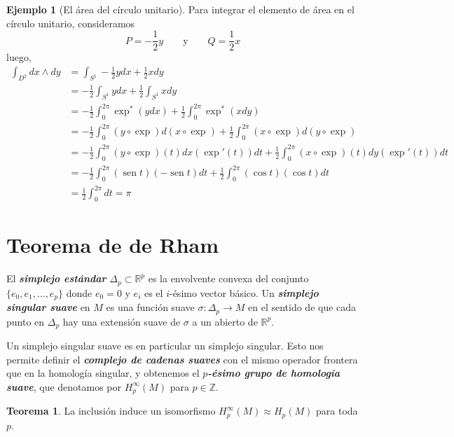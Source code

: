 \documentclass[spanish]{article}
\theoremstyle{definition}
\newtheorem*{teo}{Teorema}
\newtheorem*{ejem}{Ejemplo}
\newcommand{\R}{\mathbb{R}}
\newcommand{\Z}{\mathbb{Z}}
\DeclareMathOperator{\sen}{sen}
\begin{document}
	\begin{ejem}[El área del círculo unitario]
		Para integrar el elemento de área en el círculo unitario, consideramos
		\[P=-\frac{1}{2}y\qquad\text{y}\qquad Q=\frac{1}{2}x\]
		luego,
		\begin{align*}
			\int_{D^2}dx\wedge dy&=\int_{S^1}-\frac{1}{2}ydx+\frac{1}{2}xdy\\
			&=-\frac{1}{2}\int_{S^1}ydx+\frac{1}{2}\int_{S^1}xdy\\
			&=-\frac{1}{2}\int_0^{2\pi}\exp^*(ydx)+\frac{1}{2}\int_0^{2\pi}\exp^*(xdy)\\
			&=-\frac{1}{2}\int_0^{2\pi}(y\circ \exp)d(x\circ \exp)+\frac{1}{2}\int_0^{2\pi}(x\circ \exp)d(y\circ \exp)\\
			&=-\frac{1}{2}\int_0^{2\pi}(y\circ \exp)(t)dx(\exp'(t))dt+\frac{1}{2}\int_0^{2\pi}(x\circ \exp)(t)dy(\exp'(t))dt\\
			&=-\frac{1}{2}\int_0^{2\pi}(\sen t)(-\sen t) dt+\frac{1}{2}\int_0^{2\pi}(\cos t)(\cos t)dt\\
			&=\frac{1}{2}\int_0^{2\pi}dt=\pi
		\end{align*}
	\end{ejem}
	\fi
	
	
	\section{Teorema de de Rham}\label{sec:5}
	
	El \textbf{\textit{simplejo estándar}} $\Delta_p\subset\R^p$ es la envolvente convexa del conjunto $\{e_0,e_1,\ldots,e_p\}$ donde $e_0=0$ y $e_i$ es el $i$-ésimo vector básico. Un \textbf{\textit{simplejo singular suave}} en $M$ es una función suave $\sigma:\Delta_p\to M$ en el sentido de que cada punto en $\Delta_p$ hay una extensión suave de $\sigma$ a un abierto de $\R^p$.
	
	Un simplejo singular suave es en particular un simplejo singular. Esto nos permite definir el \textbf{\textit{complejo de cadenas suaves}} con el mismo operador frontera que en la homología singular, y obtenemos el \textbf{\textit{$p$-ésimo grupo de homología suave}}, que denotamos por $H^\infty_p(M)$ para $p\in\Z$.
	\begin{teo}
		La inclusión induce un isomorfismo $H^\infty_p(M)\approx H_p(M)$ para toda $p$.
	\end{teo}
	
\end{document}
